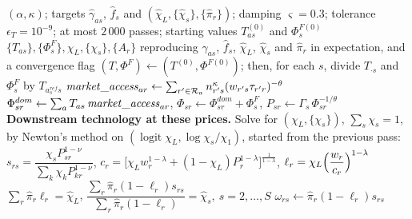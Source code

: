 \begin{algorithm}[H]
\caption{\textsc{ProfileComparativeAdvantage}: comparative advantage, foreign scale and downstream technology by matrix scaling with general-equilibrium expenditure weights}
\label{alg:invertT}
\small
\begin{algorithmic}[1]
\Require $(\alpha,\kappa)$; targets $\hat\gamma_{as}$, $\hat f_s$ and $(\hat\chi_L,\{\hat\chi_s\},\{\hat\pi_r\})$;
  damping $\varsigma=0.3$; tolerance $\epsilon_T=10^{-9}$; at most $2\,000$ passes; starting values $T^{(0)}_{as}$ and $\Phi^{F(0)}_s$
\Ensure $\{T_{as}\},\{\Phi^F_s\},\chi_L,\{\chi_s\},\{A_r\}$ reproducing $\hat\gamma_{as}$, $\hat f_s$, $\hat\chi_L$, $\hat\chi_s$ and $\hat\pi_r$ in expectation, and a convergence flag
\State $(T,\Phi^F)\gets(T^{(0)},\Phi^{F(0)})$; then, for each $s$, divide $T_{\cdot s}$ and $\Phi^F_s$ by $T_{a^{ref}_s s}$
    \State $\mathit{market\_access}_{ar}\gets\sum_{r'\in\mathcal{R}_a}n_{r's}^{\kappa}(w_{r's}\tau_{r'r})^{-\theta}$
    \State $\Phi^{dom}_{sr}\gets\sum_{a}T_{as}\,\mathit{market\_access}_{ar}$,\quad
      $\Phi_{sr}\gets\Phi^{dom}_{sr}+\Phi^F_s$,\quad
      $P_{sr}\gets\Gamma_s\,\Phi_{sr}^{-1/\theta}$
    \State \textbf{Downstream technology at these prices.} Solve for $(\chi_L,\{\chi_s\})$, $\sum_s\chi_s=1$, by Newton's method on $(\operatorname{logit}\chi_L,\log\chi_s/\chi_1)$, started from the previous pass:
    \State \quad $s_{rs}=\dfrac{\chi_s P_{sr}^{1-\nu}}{\sum_k\chi_kP_{kr}^{1-\nu}}$,\quad
      $c_r=\bigl[\chi_L w_r^{1-\lambda}+(1-\chi_L)P_r^{1-\lambda}\bigr]^{\frac1{1-\lambda}}$,\quad
      $\ell_r=\chi_L\Bigl(\dfrac{w_r}{c_r}\Bigr)^{1-\lambda}$
    \State \quad $\sum_r\hat\pi_r\ell_r=\hat\chi_L$,\qquad
      $\dfrac{\sum_r\hat\pi_r(1-\ell_r)s_{rs}}{\sum_r\hat\pi_r(1-\ell_r)}=\hat\chi_s,\ s=2,\dots,S$
    \State $\omega_{rs}\gets\hat\pi_r(1-\ell_r)s_{rs}$

\end{algorithmic}
\end{algorithm}
